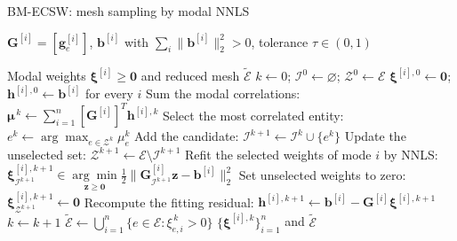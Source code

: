 \documentclass[aspectratio=169]{beamer}
\newif\ifbmecswalgorithm
\newcommand{\vect}[1]{\boldsymbol{#1}}
\newcommand{\matr}[1]{\boldsymbol{#1}}
\newcommand{\BMECSWLinkedLineNumber}[1]{%
  \hyperlink{bm-ecsw-line-#1}{\textcolor{stanfordred}{#1:}}%
}
\begin{document}
\bmecswalgorithmtrue
\begin{frame}[t]{BM-ECSW: mesh sampling by modal NNLS}
\fontsize{7}{7.4}\selectfont
\let\alglinenumber\BMECSWLinkedLineNumber
\begin{algorithmic}[1]
  \setlength{\itemsep}{-0.6pt}
  \Require \hypertarget{ecsw-bm-algorithm}{%
    $\matr{G}^{[i]}=[\vect{g}_e^{[i]}]$, $\vect{b}^{[i]}$ with $\sum_i\|\vect{b}^{[i]}\|_2^2>0$, tolerance $\tau\in(0,1)$}
  \Ensure Modal weights $\vect{\xi}^{[i]}\geq\vect{0}$ and reduced mesh $\widetilde{\mathcal E}$
  \State $k\gets0$; $\mathcal I^0\gets\varnothing$; $\mathcal Z^0\gets\mathcal E$
  \State $\vect{\xi}^{[i],0}\gets\vect{0}$; $\vect{h}^{[i],0}\gets\vect{b}^{[i]}$ for every $i$
  \While{$\sum_i\|\vect{h}^{[i],k}\|_2^2>\tau^2\sum_i\|\vect{b}^{[i]}\|_2^2$}
    \State Sum the modal correlations: $\textstyle\vect{\mu}^{\,k}\gets\sum_{i=1}^n[\matr{G}^{[i]}]^T\vect{h}^{[i],k}$
    \State Select the most correlated entity: $e^k\gets\arg\max_{e\in\mathcal Z^k}\mu_e^k$
    \State Add the candidate: $\mathcal I^{k+1}\gets\mathcal I^k\cup\{e^k\}$
    \State Update the unselected set: $\mathcal Z^{k+1}\gets\mathcal E\setminus\mathcal I^{k+1}$
      \State Refit the selected weights of mode $i$ by NNLS:
      \Statex \hspace{\dimexpr\algorithmicindent+\algorithmicindent\relax}$\displaystyle
        \vect{\xi}^{[i],k+1}_{\mathcal I^{k+1}}\in
        \underset{\vect{z}\geq\vect{0}}{\arg\min}
        \frac12\|\matr{G}^{[i]}_{\mathcal I^{k+1}}\vect{z}-\vect{b}^{[i]}\|_2^2$
      \State Set unselected weights to zero: $\vect{\xi}^{[i],k+1}_{\mathcal Z^{k+1}}\gets\vect{0}$
      \State Recompute the fitting residual: $\vect{h}^{[i],k+1}\gets\vect{b}^{[i]}-\matr{G}^{[i]}\vect{\xi}^{[i],k+1}$
    \EndFor
    \State $k\gets k+1$
  \EndWhile
  \State $\textstyle\widetilde{\mathcal E}\gets\bigcup_{i=1}^n\{e\in\mathcal E:\xi_{e,i}^{\,k}>0\}$
  \State \Return $\{\vect{\xi}^{[i],k}\}_{i=1}^n$ and $\widetilde{\mathcal E}$
\end{algorithmic}
\end{frame}
\bmecswalgorithmfalse
\end{document}
